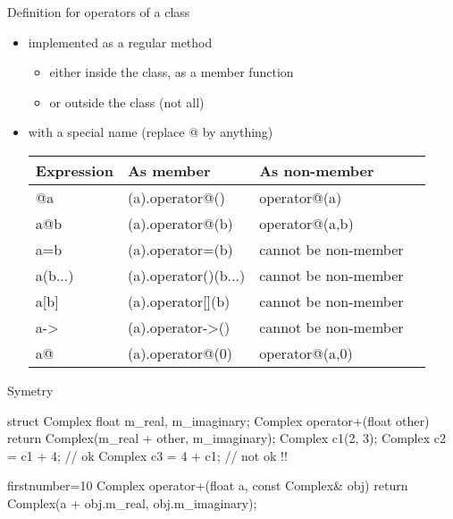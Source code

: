 \begin{frame}
  \begin{block}{Definition for operators of a class}
    \begin{itemize}
    \item implemented as a regular method
      \begin{itemize}
      \item either inside the class, as a member function
      \item or outside the class (not all)
      \end{itemize}
    \item with a special name (replace @ by anything)
      \begin{tabular}{llll}
        Expression & As member & As non-member \\
        \hline
        @a & (a).operator@() & operator@(a) \\
        a@b & (a).operator@(b) & operator@(a,b) \\
        a=b & (a).operator=(b) & cannot be non-member \\
        a(b...) & (a).operator()(b...) & cannot be non-member \\
        a[b] & (a).operator[](b) & cannot be non-member \\
        a-\textgreater & (a).operator-\textgreater() & cannot be non-member \\
        a@ & (a).operator@(0) & operator@(a,0) \\
      \end{tabular}
    \end{itemize}
  \end{block}
\end{frame}

\begin{frame}[fragile]
  \begin{block}{Symetry}
    \begin{cppcode}
      struct Complex {
        float m_real, m_imaginary;
        Complex operator+(float other) {
          return Complex(m_real + other, m_imaginary);
        }
      }
      Complex c1(2, 3);
      Complex c2 = c1 + 4;  // ok
      Complex c3 = 4 + c1;  // not ok !!
    \end{cppcode}
    \pause
    \begin{cppcode*}{firstnumber=10}
      Complex operator+(float a, const Complex& obj) {
        return Complex(a + obj.m_real, obj.m_imaginary);
      }
    \end{cppcode*}
  \end{block}
\end{frame}

